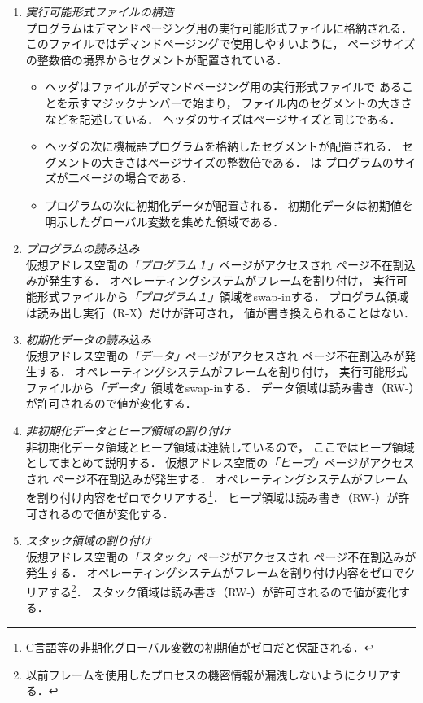 \begin{enumerate}
\item \emph{実行可能形式ファイルの構造} \\
  プログラムはデマンドページング用の実行可能形式ファイルに格納される．
  このファイルではデマンドページングで使用しやすいように，
  ページサイズの整数倍の境界からセグメントが配置されている．
  \begin{itemize}
  \item ヘッダはファイルがデマンドページング用の実行形式ファイルで
    あることを示すマジックナンバーで始まり，
    ファイル内のセグメントの大きさなどを記述している．
    ヘッダのサイズはページサイズと同じである．
  \item ヘッダの次に機械語プログラムを格納したセグメントが配置される．
    セグメントの大きさはページサイズの整数倍である．
    は
    プログラムのサイズが二ページの場合である．
  \item プログラムの次に初期化データが配置される．
    初期化データは初期値を明示したグローバル変数を集めた領域である．
  \end{itemize}
\item \emph{プログラムの読み込み} \\
  仮想アドレス空間の\emph{「プログラム１」}ページがアクセスされ
  ページ不在割込みが発生する．
  オペレーティングシステムがフレームを割り付け，
  実行可能形式ファイルから\emph{「プログラム１」}領域をswap-inする．
  プログラム領域は読み出し実行（R-X）だけが許可され，
  値が書き換えられることはない．
\item \emph{初期化データの読み込み} \\
  仮想アドレス空間の\emph{「データ」}ページがアクセスされ
  ページ不在割込みが発生する．
  オペレーティングシステムがフレームを割り付け，
  実行可能形式ファイルから\emph{「データ」}領域をswap-inする．
  データ領域は読み書き（RW-）が許可されるので値が変化する．
\item \emph{非初期化データとヒープ領域の割り付け} \\
  非初期化データ領域とヒープ領域は連続しているので，
  ここではヒープ領域としてまとめて説明する．
  仮想アドレス空間の\emph{「ヒープ」}ページがアクセスされ
  ページ不在割込みが発生する．
  オペレーティングシステムがフレームを割り付け内容をゼロでクリアする\footnote{
  C言語等の非期化グローバル変数の初期値がゼロだと保証される．}．
  ヒープ領域は読み書き（RW-）が許可されるので値が変化する．
\item \emph{スタック領域の割り付け} \\
  仮想アドレス空間の\emph{「スタック」}ページがアクセスされ
  ページ不在割込みが発生する．
  オペレーティングシステムがフレームを割り付け内容をゼロでクリアする\footnote{
  以前フレームを使用したプロセスの機密情報が漏洩しないようにクリアする．}．
  スタック領域は読み書き（RW-）が許可されるので値が変化する．
\end{enumerate}

